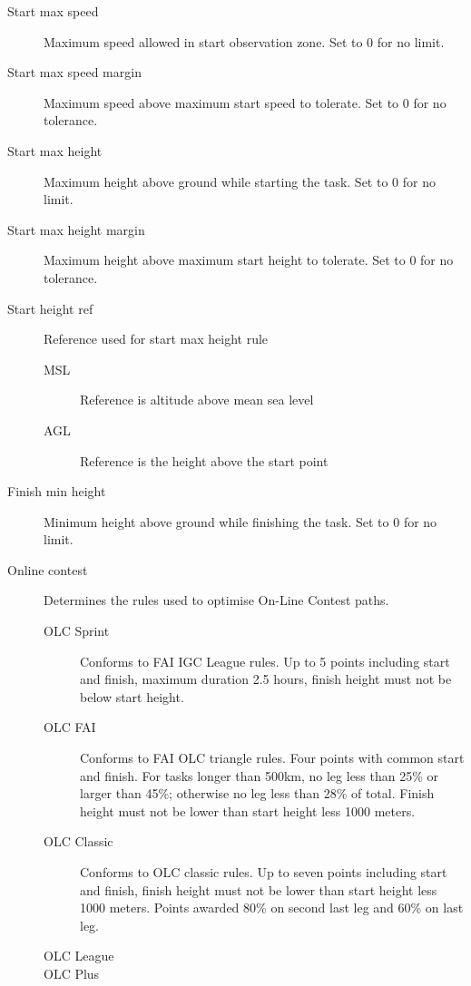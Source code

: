 \documentclass[a4paper,12pt]{refrep}
\begin{document}
\begin{description}
\item[Start max speed]  Maximum speed allowed in start observation zone.  Set to 0 for no limit.
\item[Start max speed margin] Maximum speed above maximum start speed to tolerate.  Set to 0 for no tolerance.
\item[Start max height]  Maximum height above ground while starting the task.  Set to 0 for no limit.
\item[Start max height margin]  Maximum height above maximum start height to tolerate.  Set to 0 for no tolerance.
\item[Start height ref]  Reference used for start max height rule
\begin{description}
\item[MSL] Reference is altitude above mean sea level
\item[AGL] Reference is the height above the start point
\end{description}
\item[Finish min height]  Minimum height above ground while finishing the task.  Set to 0 for no limit. 
\item[Online contest] Determines the rules used to optimise On-Line Contest paths. 
\begin{description}
\item[OLC Sprint]  Conforms to FAI IGC League rules.  Up to 5
points including start and finish, maximum duration 2.5 hours, finish height must not be below start height.
\item[OLC FAI]  Conforms to FAI OLC triangle rules.  Four points
with common start and finish.  For tasks longer than 500km, no leg less than 25\% or larger than 45\%; otherwise 
no leg less than 28\% of total.  Finish height must not be lower than start height less 1000 meters.
\item[OLC Classic]  Conforms to OLC classic rules.  Up to seven
points including start and finish, finish height must not be lower than start height less 1000 meters.  
Points awarded 80\% on second last leg and 60\% on last leg.
\item[OLC League]
\item[OLC Plus]  
\end{description}
\end{description}
\end{document}
